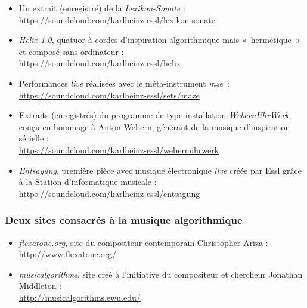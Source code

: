 \documentclass[a4paper,12pt]{article}
\newcommand{\guill}[1]{«~#1~»}
\newcommand{\maze}[0]{\emph{m\symbol{64}ze\textdegree2}}
\begin{document}
\begin{itemize}
\item Un extrait (enregistré) de la \emph{Lexikon-Sonate} : \\ \href{https://soundcloud.com/karlheinz-essl/lexikon-sonate}{https://soundcloud.com/karlheinz-essl/lexikon-sonate}
\item \emph{Helix 1.0}, quatuor à cordes d'inspiration algorithmique mais \guill{hermétique} et composé sans ordinateur : \\ \href{https://soundcloud.com/karlheinz-essl/helix}{https://soundcloud.com/karlheinz-essl/helix}
\item Performances \emph{live} réalisées avec le méta-instrument \maze~: \\ \href{https://soundcloud.com/karlheinz-essl/sets/maze}{https://soundcloud.com/karlheinz-essl/sets/maze}
\item Extraits (enregistrés) du programme de type installation \emph{WebernUhrWerk}, conçu en hommage à Anton Webern, générant de la musique d'inspiration sérielle : \\ \href{https://soundcloud.com/karlheinz-essl/webernuhrwerk}{https://soundcloud.com/karlheinz-essl/webernuhrwerk}
\item \emph{Entsagung}, première pièce avec musique électronique \emph{live} créée par Essl grâce à la Station d'informatique musicale : \\ \href{https://soundcloud.com/karlheinz-essl/entsagung}{https://soundcloud.com/karlheinz-essl/entsagung}
\end{itemize}

\subsubsection*{Deux sites consacrés à la musique algorithmique}

\begin{itemize}
\item \emph{flexatone.org}, site du compositeur contemporain Christopher Ariza : \\ \href{http://www.flexatone.org/}{http://www.flexatone.org/}
\item \emph{musicalgorithms}, site créé à l'initiative du compositeur et chercheur Jonathan Middleton : \\ \href{http://musicalgorithms.ewu.edu/}{http://musicalgorithms.ewu.edu/}
\end{itemize}
\end{document}
